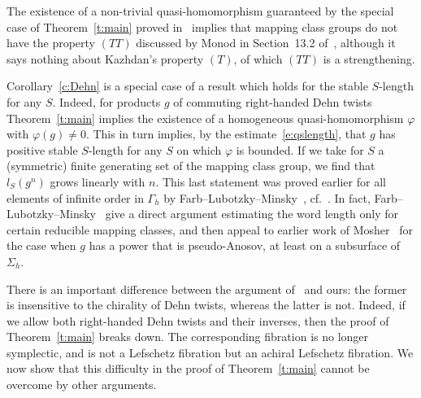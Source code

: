 \documentclass[12pt]{amsart}
\theoremstyle{remark}
\theoremstyle{definition}
\begin{document}
The existence of a non-trivial quasi-homomorphism guaranteed by the 
special case of Theorem~\ref{t:main} proved in~\cite{EK} implies that 
mapping class groups do not have the property $(TT)$ discussed by 
Monod in Section~13.2 of~\cite{Monod}, although it says nothing about 
Kazhdan's property $(T)$, of which $(TT)$ is a strengthening.

Corollary~\ref{c:Dehn} is a special case of a result which holds for 
the stable $S$-length for any $S$. Indeed, for products $g$ of commuting 
right-handed Dehn twists Theorem~\ref{t:main} implies the existence of a 
homogeneous quasi-homomorphism $\varphi$ with $\varphi(g)\neq 0$. 
This in turn implies, by the estimate~\eqref{e:qslength}, that $g$ has positive 
stable $S$-length for any $S$ on which $\varphi$ is bounded. If we 
take for $S$ a (symmetric) finite generating set of the mapping class 
group, we find that $l_{S}(g^{n})$ grows linearly with $n$. This last 
statement was proved earlier for all elements of infinite order in 
$\Gamma_{h}$ by Farb--Lubotzky--Minsky~\cite{FLM}, cf.~\cite{Kork}. In fact, 
Farb--Lubotzky--Minsky~\cite{FLM} give a direct argument estimating 
the word length only for certain reducible mapping classes, and then 
appeal to earlier work of Mosher~\cite{Mosher} for the case when $g$ 
has a power that is pseudo-Anosov, at least on a subsurface of 
$\Sigma_{h}$.

There is an important difference between the argument of~\cite{FLM} 
and ours: the former is insensitive to the chirality of Dehn twists, 
whereas the latter is not. Indeed, if we allow both right-handed Dehn twists 
and their inverses, then the proof of Theorem~\ref{t:main} breaks 
down. The corresponding fibration is no longer symplectic, and is not 
a Lefschetz fibration but an achiral Lefschetz fibration. We now show 
that this difficulty in the proof of Theorem~\ref{t:main} cannot be 
overcome by other arguments.
\end{document}
